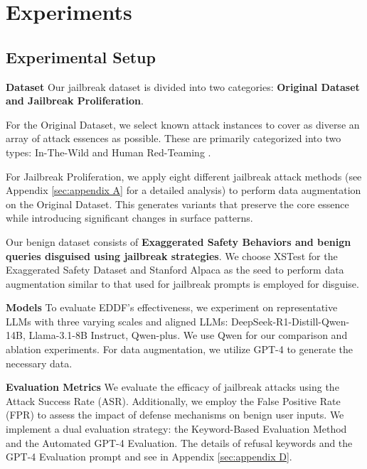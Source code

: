 \section{Experiments}
\subsection{Experimental Setup}
\textbf{Dataset}  Our jailbreak dataset is divided into two categories: \textbf{Original Dataset and Jailbreak Proliferation}. 

For the Original Dataset, we select known attack instances to cover as diverse an array of attack essences as possible. These are primarily categorized into two types: In-The-Wild  \citep{shen2024anything} and Human Red-Teaming  \citep{jiang2024wildteaming}.

For Jailbreak Proliferation, we apply eight different jailbreak attack methods (see Appendix \ref{sec:appendix A} for a detailed analysis) to perform data augmentation on the Original Dataset. This generates variants that preserve the core essence while introducing significant changes in surface patterns.

Our benign dataset consists of \textbf{Exaggerated Safety Behaviors and benign queries disguised using jailbreak strategies}. We choose XSTest\citep{rottger2023xstest} for the Exaggerated Safety Dataset and Stanford Alpaca\citep{alpaca} as the seed to perform data augmentation similar to that used for jailbreak prompts is employed for disguise.

\textbf{Models} To evaluate EDDF’s effectiveness, we experiment on representative LLMs with three varying scales and aligned LLMs: DeepSeek-R1-Distill-Qwen-14B\citep{guo2025deepseek}, Llama-3.1-8B Instruct\citep{dubey2024llama}, Qwen-plus\citep{yang2024qwen2}. We use Qwen for our comparison and ablation experiments. For data augmentation, we utilize GPT-4 \citep{achiam2023gpt} to generate the necessary data.

\textbf{Evaluation Metrics} We evaluate the efficacy of jailbreak attacks using the Attack Success Rate (ASR). Additionally, we employ the False Positive Rate (FPR) to assess the impact of defense mechanisms on benign user inputs. We implement a dual evaluation strategy: the Keyword-Based Evaluation Method and the Automated GPT-4 Evaluation\citep{hurst2024gpt}. The details of refusal keywords and the GPT-4 Evaluation prompt and see in Appendix \ref{sec:appendix D}.

